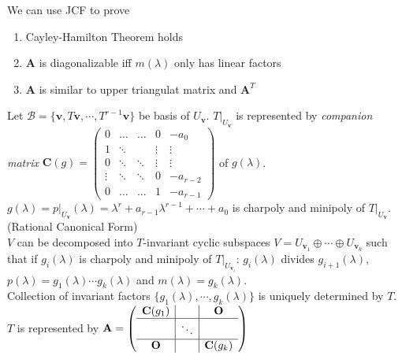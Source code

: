 \documentclass{article}
\theoremstyle{definition}
\begin{document}
We can use JCF to prove
\begin{enumerate}
    \item Cayley-Hamilton Theorem holds
    \item $\mathbf{A}$ is diagonalizable iff $m(\lambda)$ only has linear factors
    \item $\mathbf{A}$ is similar to upper triangulat matrix and $\mathbf{A}^{T}$
\end{enumerate}
Let $\mathcal{B}=\{\mathbf{v},T\mathbf{v},\cdots,T^{r-1}\mathbf{v}\}$ be basis of $U_{\mathbf{v}}$. $T\vert_{U_{\mathbf{v}}}$ is represented by \textit{companion matrix} $\mathbf{C}(g)=\begin{pmatrix}
    0 & \hdots & \hdots & 0 & -a_{0}\\
    1 & \ddots & & \vdots & \vdots\\
    0 & \ddots & \ddots & \vdots & \vdots\\
    \vdots & \ddots & \ddots & 0 & -a_{r-2}\\
    0 & \hdots & \hdots & 1 & -a_{r-1}
\end{pmatrix}$ of $g(\lambda)$.\\
$g(\lambda)=p\vert_{U_{\mathbf{v}}}(\lambda)=\lambda^{r}+a_{r-1}\lambda^{r-1}+\cdots+a_{0}$ is charpoly and minipoly of $T\vert_{U_{\mathbf{v}}}$.\\
(Rational Canonical Form)\\
$V$ can be decomposed into $T$-invariant cyclic subspaces $V=U_{\mathbf{v}_{1}}\oplus\cdots\oplus U_{\mathbf{v}_{k}}$ such that if $g_{i}(\lambda)$ is charpoly and minipoly of $T\vert_{U_{\mathbf{v}_{i}}}$:
$g_{i}(\lambda)$ divides $g_{i+1}(\lambda)$, $p(\lambda)=g_{1}(\lambda)\cdots g_{k}(\lambda)$ and $m(\lambda)=g_{k}(\lambda)$.\\
Collection of invariant factors $\{g_{1}(\lambda),\cdots,g_{k}(\lambda)\}$ is uniquely determined by $T$. $T$ is represented by $\mathbf{A}=\begin{pmatrix}
\begin{array}{c|c|c}
    \mathbf{C}(g_{1}) & & \mathbf{O}\\
    \hline
    & \ddots\\
    \hline
    \mathbf{O} & & \mathbf{C}(g_{k})
\end{array}
\end{pmatrix}$
\end{document}
